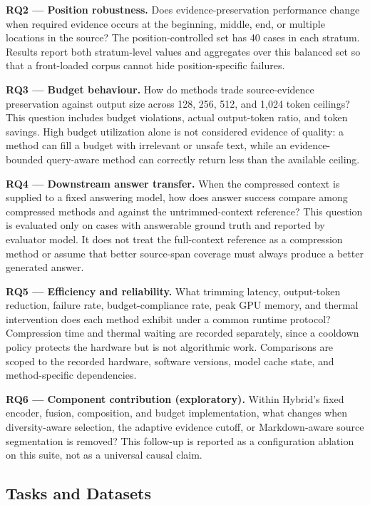 \documentclass[
]{article}
\begin{document}
\textbf{RQ2 --- Position robustness.} Does evidence-preservation
performance change when required evidence occurs at the beginning,
middle, end, or multiple locations in the source? The
position-controlled set has 40 cases in each stratum. Results report
both stratum-level values and aggregates over this balanced set so that
a front-loaded corpus cannot hide position-specific failures.

\textbf{RQ3 --- Budget behaviour.} How do methods trade source-evidence
preservation against output size across 128, 256, 512, and 1,024 token
ceilings? This question includes budget violations, actual output-token
ratio, and token savings. High budget utilization alone is not
considered evidence of quality: a method can fill a budget with
irrelevant or unsafe text, while an evidence-bounded query-aware method
can correctly return less than the available ceiling.

\textbf{RQ4 --- Downstream answer transfer.} When the compressed context
is supplied to a fixed answering model, how does answer success compare
among compressed methods and against the untrimmed-context reference?
This question is evaluated only on cases with answerable ground truth
and reported by evaluator model. It does not treat the full-context
reference as a compression method or assume that better source-span
coverage must always produce a better generated answer.

\textbf{RQ5 --- Efficiency and reliability.} What trimming latency,
output-token reduction, failure rate, budget-compliance rate, peak GPU
memory, and thermal intervention does each method exhibit under a common
runtime protocol? Compression time and thermal waiting are recorded
separately, since a cooldown policy protects the hardware but is not
algorithmic work. Comparisons are scoped to the recorded hardware,
software versions, model cache state, and method-specific dependencies.

\textbf{RQ6 --- Component contribution (exploratory).} Within Hybrid's
fixed encoder, fusion, composition, and budget implementation, what changes
when diversity-aware selection, the adaptive evidence cutoff, or
Markdown-aware source segmentation is removed? This follow-up is reported as
a configuration ablation on this suite, not as a universal causal claim.

\subsection{Tasks and Datasets}\label{tasks-and-datasets}
\end{document}
